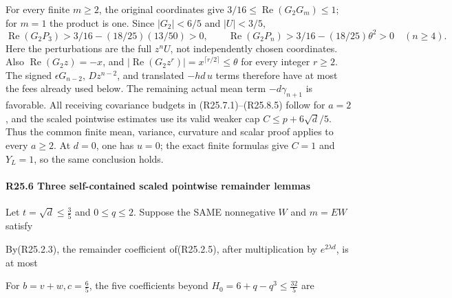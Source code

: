 For every finite \(m\ge2\), the original coordinates give
\(3/16\le\operatorname{Re}(G_2G_m)\le1\); for \(m=1\) the
product is one. Since \(|G_2|<6/5\) and \(|U|<3/5\),
\[
 \operatorname{Re}(G_2P_3)>
 3/16-(18/25)(13/50)>0,\qquad
 \operatorname{Re}(G_2P_n)>
 3/16-(18/25)\theta^2>0\quad(n\ge4).
\]
Here the perturbations are the full \(z^nU\), not independently
chosen coordinates. Also \(\operatorname{Re}(G_2z)=-x\), and
\(|\operatorname{Re}(G_2z^r)|=x^{\lceil r/2\rceil}\le\theta\)
for every integer \(r\ge2\). The signed \(\epsilon G_{n-2}\),
\(Dz^{n-2}\), and translated \(-hd\,u\) terms therefore have
at most the fees already used below. The remaining actual mean
term \(-d\gamma_{n+1}\) is favorable. All receiving covariance
budgets in (R25.7.1)--(R25.8.5) follow for \(a=2\), and the
scaled pointwise estimates use its valid weaker cap
\(C\le p+6\sqrt d/5\). Thus the common finite mean, variance,
curvature and scalar proof applies to every \(a\ge2\).
At \(d=0\), one has \(u=0\); the exact finite formulas give
\(C=1\) and \(Y_L=1\), so the same conclusion holds.

\paragraph{R25.6 Three self-contained scaled pointwise remainder lemmas}
\label{part:R25:scaled-curvature}

Let \(t=\sqrt{d}\le \frac{3}{5}\) and \(0\le q\le 2\). Suppose the SAME nonnegative \(W\) and \(m=EW\) satisfy


By(R25.2.3), the remainder coefficient of(R25.2.5), after multiplication by \(e^{2\lambda d}\), is at most


For \(b=v+w,\allowbreak \allowbreak c=\frac{6}{5}\), the five coefficients beyond \(H_{0}=6+q-q^3\le \frac{32}{5}\) are


